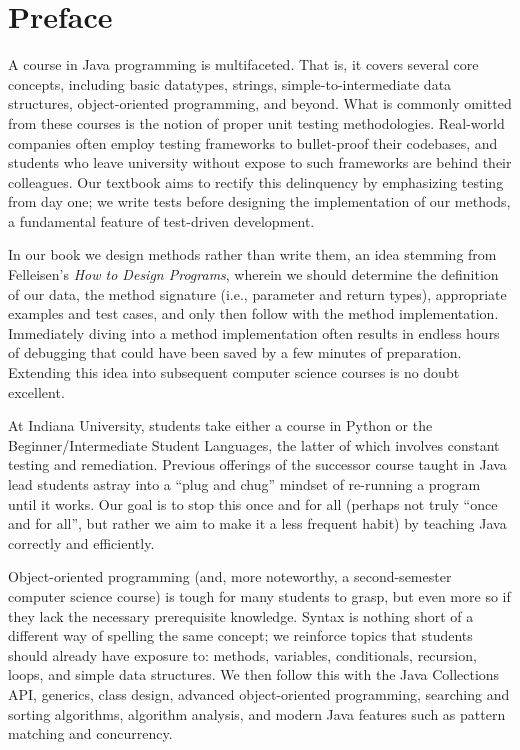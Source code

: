 \chapter*{Preface}

A course in Java programming is multifaceted. That is, it covers several core concepts, including basic datatypes, strings, simple-to-intermediate data structures, object-oriented programming, and beyond. What is commonly omitted from these courses is the notion of proper unit testing methodologies. Real-world companies often employ testing frameworks to bullet-proof their codebases, and students who leave university without expose to such frameworks are behind their colleagues. Our textbook aims to rectify this delinquency by emphasizing testing from day one; we write tests before designing the implementation of our methods, a fundamental feature of test-driven development.

In our book we design methods rather than write them, an idea stemming from Felleisen's \textit{How to Design Programs}, wherein we should determine the definition of our data, the method signature (i.e., parameter and return types), appropriate examples and test cases, and only then follow with the method implementation. Immediately diving into a method implementation often results in endless hours of debugging that could have been saved by a few minutes of preparation. Extending this idea into subsequent computer science courses is no doubt excellent.

At Indiana University, students take either a course in Python or the Beginner/Intermediate Student Languages, the latter of which involves constant testing and remediation. Previous offerings of the successor course taught in Java lead students astray into a ``plug and chug'' mindset of re-running a program until it works. Our goal is to stop this once and for all (perhaps not truly ``once and for all'', but rather we aim to make it a less frequent habit) by teaching Java correctly and efficiently. 

Object-oriented programming (and, more noteworthy, a second-semester computer science course) is tough for many students to grasp, but even more so if they lack the necessary prerequisite knowledge. Syntax is nothing short of a different way of spelling the same concept; we reinforce topics that students should already have exposure to: methods, variables, conditionals, recursion, loops, and simple data structures. We then follow this with the Java Collections API, generics, class design, advanced object-oriented programming, searching and sorting algorithms, algorithm analysis, and modern Java features such as pattern matching and concurrency. 

